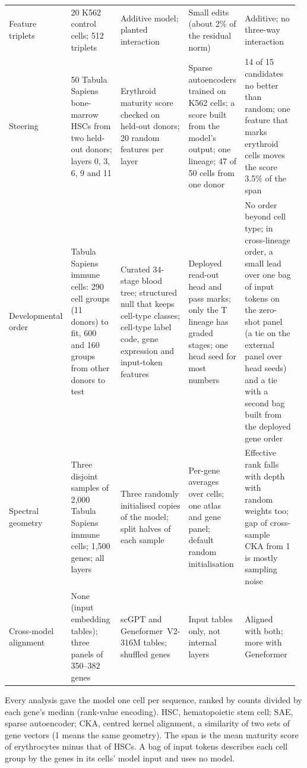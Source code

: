 {\begin{longtable}{@{}p{0.15\linewidth}p{0.20\linewidth}p{0.18\linewidth}p{0.20\linewidth}p{0.24\linewidth}@{}}
Feature triplets & 20 K562 control cells; 512 triplets & Additive
model; planted interaction & Small edits (about 2\% of the residual
norm) & Additive; no three-way interaction \\
Steering & 50 Tabula Sapiens bone-marrow HSCs from two held-out donors; layers 0, 3, 6, 9 and 11 & Erythroid maturity score checked on held-out donors; 20 random features per layer & Sparse autoencoders trained on K562 cells; a score built from the model's output; one lineage; 47 of 50 cells from one donor & 14 of 15 candidates no better than random; one feature that marks erythroid cells moves the score 3.5\% of the span \\
Developmental order & Tabula Sapiens immune cells: 290 cell groups (11 donors) to fit, 600 and 160 groups from other donors to test & Curated 34-stage blood tree; structured null that keeps cell-type classes; cell-type label code, gene expression and input-token features & Deployed read-out head and pass marks; only the T lineage has graded stages; one head seed for most numbers & No order beyond cell type; in cross-lineage order, a small lead over one bag of input tokens on the zero-shot panel (a tie on the external panel over head seeds) and a tie with a second bag built from the deployed gene order \\
Spectral geometry & Three disjoint samples of 2,000 Tabula Sapiens immune cells; 1,500 genes; all layers & Three randomly initialised copies of the model; split halves of each sample & Per-gene averages over cells; one atlas and gene panel; default random initialisation & Effective rank falls with depth with random weights too; gap of cross-sample CKA from 1 is mostly sampling noise \\
Cross-model alignment & None (input embedding tables); three panels of
350--382 genes & scGPT and Geneformer~V2-316M tables; shuffled genes &
Input tables only, not internal layers & Aligned with both; more with
Geneformer \\
\end{longtable}
\begin{flushleft}
Every analysis gave
the model one cell per sequence, ranked by counts divided by each gene's
median (rank-value encoding). HSC, hematopoietic stem cell; SAE, sparse
autoencoder; CKA, centred kernel alignment, a similarity of two sets of
gene vectors (1 means the same geometry). The span is the mean maturity
score of erythrocytes minus that of HSCs. A bag of input tokens describes
each cell group by the genes in its cells' model input and uses no model.
\end{flushleft}
}
